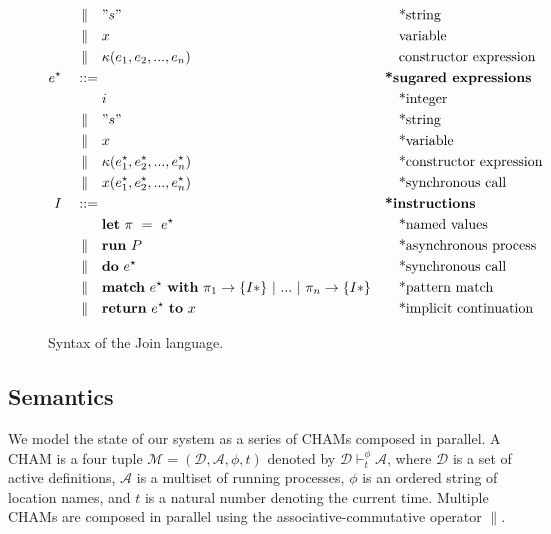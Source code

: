 \begin{figure}
\begin{align*}
\mid\kern-1pt\mid\quad& " s "         && \quad\textrm{*string} \\
\mid\kern-1pt\mid\quad& x               && \quad\textrm{variable} \\
\mid\kern-1pt\mid\quad& \kappa(e_1, e_2, ..., e_n)
                           && \quad\textrm{constructor expression} \\
e^\star\quad ::={}&         && \textbf{*sugared expressions} \\
         & i               && \quad\textrm{*integer} \\
\mid\kern-1pt\mid\quad& " s "         && \quad\textrm{*string} \\
\mid\kern-1pt\mid\quad& x               && \quad\textrm{*variable} \\
\mid\kern-1pt\mid\quad& \kappa(e^\star_1, e^\star_2, ..., e^\star_n)
                           && \quad\textrm{*constructor expression} \\
\mid\kern-1pt\mid\quad& x(e^\star_1, e^\star_2, ..., e^\star_ n)
                           && \quad\textrm{*synchronous call} \\
I\quad ::={}&              && \textbf{*instructions} \\
         & \mathbf{let}~\pi~=~e^\star
                           && \quad\textrm{*named values} \\
\mid\kern-1pt\mid\quad& \mathbf{run}~P  && \quad\textrm{*asynchronous process} \\
\mid\kern-1pt\mid\quad& \mathbf{do}~e^\star && \quad\textrm{*synchronous call} \\
\mid\kern-1pt\mid\quad& \textbf{match}~e^\star~\textbf{with}~\pi_1
               \rightarrow \{ I* \} ~|~ ... ~|~ \pi_n \rightarrow \{ I* \}
                           && \quad\textrm{*pattern match} \\
\mid\kern-1pt\mid\quad& \textbf{return}~e^\star~\textbf{to}~x
                           && \quad\textrm{*implicit continuation}
\end{align*}
\caption{Syntax of the Join language.\label{fig:syntax}}
\end{figure}


\subsection{Semantics}

We model the state of our system as a series of CHAMs composed in parallel. A
CHAM is a four tuple $\mathcal{M} = (\mathcal{D}, \mathcal{A}, \phi, t)$
denoted by $\mathcal{D} \vdash^\phi_t \mathcal{A}$, where $\mathcal{D}$ is a
set of active definitions, $\mathcal{A}$ is a multiset of running processes,
$\phi$ is an ordered string of location names, and $t$ is a natural number
denoting the current time. Multiple CHAMs are composed in parallel using the
associative-commutative operator $\parallel$.

